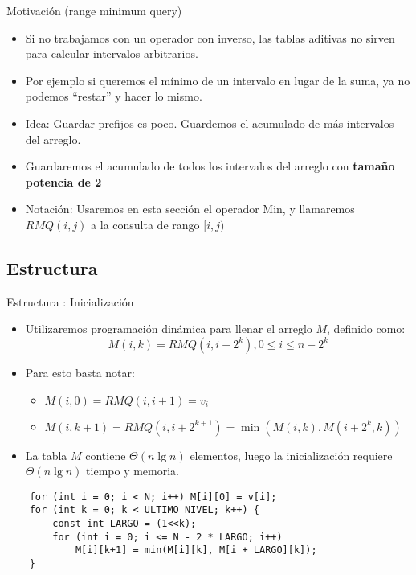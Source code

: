 \documentclass{beamer}
\DeclareMathOperator*{\mimin}{min}
\begin{document}
\begin{frame}{Motivación (range minimum query)}
    \begin{itemize}
        \item Si no trabajamos con un operador con inverso, las tablas aditivas no sirven para calcular intervalos arbitrarios.
        \item Por ejemplo si queremos el mínimo de un intervalo en lugar de la suma, ya no podemos ``restar'' y hacer lo mismo.
        \item Idea: Guardar prefijos es poco. Guardemos el acumulado de más intervalos del arreglo.
        \item Guardaremos el acumulado de todos los intervalos del arreglo con \textbf{tamaño potencia de 2}
        \item Notación: Usaremos en esta sección el operador Min, y llamaremos $RMQ(i,j)$ a la consulta de rango $[i,j)$
    \end{itemize}
\end{frame}

\subsection{Estructura}

\begin{frame}[fragile]{Estructura : Inicialización}
\begin{itemize}
    \small
      \item Utilizaremos programación dinámica para llenar el arreglo $M$, definido como:
      $$M(i,k) = RMQ(i,i+2^k), 0 \leq i \leq n - 2^k$$
      \item Para esto basta notar:
        \begin{itemize}
          \item $M(i,0) = RMQ(i,i+1) = v_i$
          \item $M(i,k+1) = RMQ(i,i + 2^{k+1}) = \mimin(M(i,k),M(i+2^k,k))$
        \end{itemize}
      \item La tabla $M$ contiene $\Theta(n \lg n)$ elementos, luego la inicialización requiere $\Theta(n \lg n)$ tiempo y memoria.
    \end{itemize}
\begin{lstlisting}
    for (int i = 0; i < N; i++) M[i][0] = v[i];
    for (int k = 0; k < ULTIMO_NIVEL; k++) {
        const int LARGO = (1<<k);
        for (int i = 0; i <= N - 2 * LARGO; i++)
            M[i][k+1] = min(M[i][k], M[i + LARGO][k]);
    }
\end{lstlisting}
\end{frame}
\end{document}
